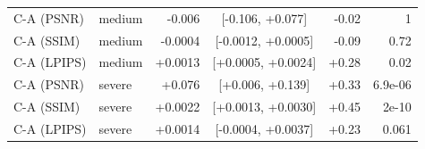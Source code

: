 \begin{table}[t]
\begin{tabular}{llrcrr}
C-A (PSNR) & medium & -0.006 & [-0.106, +0.077] & -0.02 & 1 \\
C-A (SSIM) & medium & -0.0004 & [-0.0012, +0.0005] & -0.09 & 0.72 \\
C-A (LPIPS) & medium & +0.0013 & [+0.0005, +0.0024] & +0.28 & 0.02 \\
C-A (PSNR) & severe & +0.076 & [+0.006, +0.139] & +0.33 & 6.9e-06 \\
C-A (SSIM) & severe & +0.0022 & [+0.0013, +0.0030] & +0.45 & 2e-10 \\
C-A (LPIPS) & severe & +0.0014 & [-0.0004, +0.0037] & +0.23 & 0.061 \\
\bottomrule
\end{tabular}
\end{table}
